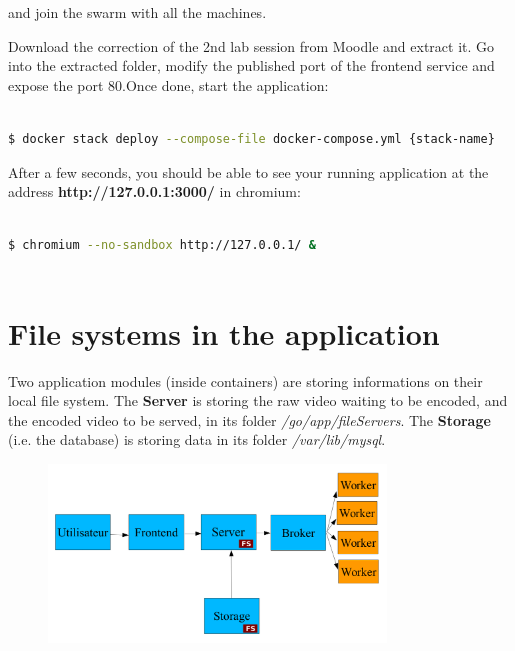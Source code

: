 \documentclass[a4paper,11pt]{exam}
\begin{document}
and join the swarm with all the machines.

Download the correction of the 2nd lab session from Moodle and extract it. 
Go into the extracted folder, modify the published port of the frontend service and expose the port 80.Once done, start the application:

\begin{lstlisting}[frame=single,language={sh}]  % Start your code-block

$ docker stack deploy --compose-file docker-compose.yml {stack-name}

\end{lstlisting}

After a few seconds, you should be able to see your running application at the address \textbf{http://127.0.0.1:3000/} in chromium:

\begin{lstlisting}[frame=single,language={sh}]  % Start your code-block

$ chromium --no-sandbox http://127.0.0.1/ &
		
\end{lstlisting}

\clearpage

\section{File systems in the application}

Two application modules (inside containers) are storing informations on their local file system. 
The \textbf{Server} is storing the raw video waiting to be encoded, and the encoded video to be served, in its folder \textit{/go/app/fileServers}. 
The \textbf{Storage} (i.e. the database) is storing data in its folder \textit{/var/lib/mysql}. 

\begin{figure}[!ht]
	\centering
	\includegraphics[width=0.8\textwidth]{fig/architecture.png}
	\label{fig:architecture}
\end{figure}
\end{document}
